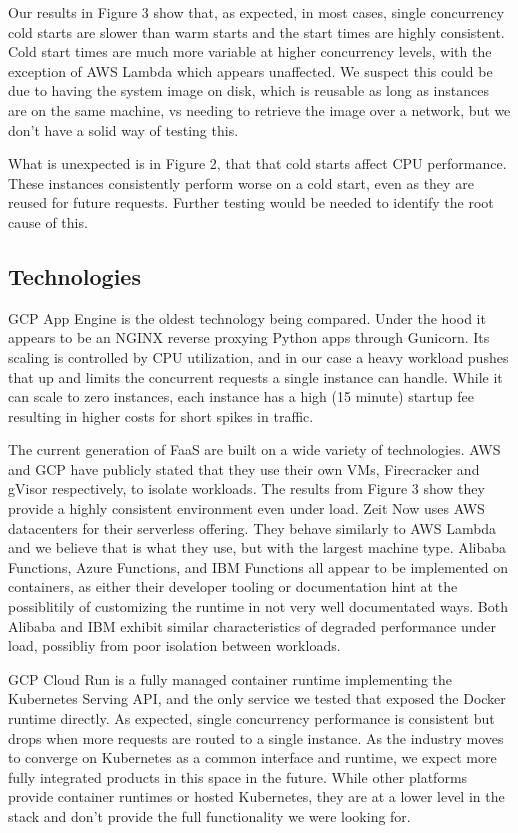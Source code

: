 \documentclass[11pt]{article}
\begin{document}
Our results in Figure 3 %
show that, as expected, in most cases,
single concurrency cold starts are slower than warm starts
and the start times are highly consistent.
Cold start times are much more variable at higher concurrency levels,
with the exception of AWS Lambda which appears unaffected.
We suspect this could be due to having the system image on disk,
which is reusable as long as instances are on the same machine,
vs needing to retrieve the image over a network,
but we don't have a solid way of testing this.

What is unexpected is in Figure 2, %
that that cold starts affect CPU performance.
These instances consistently perform worse on a cold start,
even as they are reused for future requests.
Further testing would be needed to identify the root cause of this.

\subsection{Technologies}
GCP App Engine is the oldest technology being compared.
Under the hood it appears to be an NGINX reverse proxying Python apps through Gunicorn.
Its scaling is controlled by CPU utilization,
and in our case a heavy workload pushes that up
and limits the concurrent requests a single instance can handle.
While it can scale to zero instances,
each instance has a high (15 minute) startup fee %
resulting in higher costs for short spikes in traffic.

The current generation of FaaS are built on a wide variety of technologies.
AWS and GCP have publicly stated that they use their own VMs,
Firecracker and gVisor respectively, to isolate workloads.
The results from Figure 3 %
show they provide a highly consistent environment even under load.
Zeit Now uses AWS datacenters %
for their serverless offering.
They behave similarly to AWS Lambda
and we believe that is what they use, but with the largest machine type.
Alibaba Functions, Azure Functions, and IBM Functions
all appear to be implemented on containers,
as either their developer tooling or documentation
hint at the possiblitily of customizing the runtime in not very well documentated ways.
Both Alibaba and IBM exhibit similar characteristics of degraded performance under load,
possibliy from poor isolation between workloads.

GCP Cloud Run is a fully managed container runtime implementing the Kubernetes Serving API,
and the only service we tested that exposed the Docker runtime directly.
As expected, single concurrency performance is consistent
but drops when more requests are routed to a single instance.
As the industry moves to converge on Kubernetes as a common interface and runtime,
we expect more fully integrated products in this space in the future.
While other platforms provide container runtimes or hosted Kubernetes,
they are at a lower level in the stack and don't provide the full functionality we were looking for.
\end{document}
